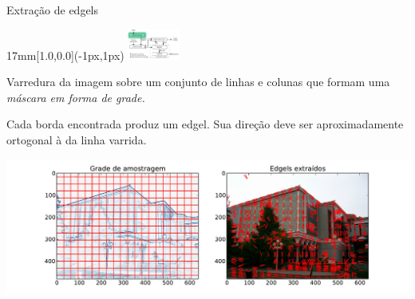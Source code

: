\begin{frame}{Extração de edgels}
  \begin{textblock*}{17mm}[1.0,0.0](\paperwidth-1px,1px)
    \includegraphics[width=17mm]{blocos_s1.png}
  \end{textblock*}
  Varredura da imagem sobre um conjunto de linhas e colunas que formam uma {\em
    máscara em forma de grade.}

  Cada borda encontrada produz um edgel. Sua direção deve ser aproximadamente
  ortogonal à da linha varrida.
  \centerline{\includegraphics[height=8\baselineskip]{griddemo2.pdf}}

\end{frame}















